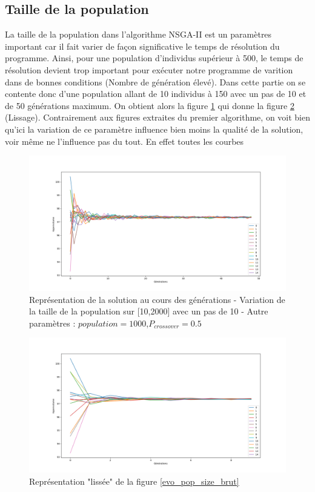 \documentclass[12pt]{report}
\begin{document}
      \subsection{Taille de la population}
      La taille de la population dans l'algorithme NSGA-II est un paramètres important car il fait varier de façon significative le temps de résolution du programme. Ainsi, pour une population d'individus supérieur à 500, le temps de résolution devient trop important pour exécuter notre programme de varition dans de bonnes conditions (Nombre de génération élevé). Dans cette partie on se contente donc d'une population allant de 10 individus à 150 avec un pas de 10 et de 50 générations maximum. On obtient alors la figure \ref{sch_pop_size_moy} qui donne la figure \ref{sch_pop_size_liss} (Lissage).
      Contrairement aux figures extraites du premier algorithme, on voit bien qu'ici la variation de ce paramètre influence bien moins la qualité de la solution, voir même ne l'influence pas du tout. En effet toutes les courbes



      \begin{figure}[h]
        \centering
        \includegraphics[width=15cm]{img/pop_size_sch_moy.png}
        \caption{Représentation de la solution au cours des générations - Variation de la taille de la population sur [10,2000] avec un pas de 10 - Autre paramètres : $population = 1000$,$P_{crossover} = 0.5$}
        \label{sch_pop_size_moy}
      \end{figure}

      \begin{figure}[!]
        \centering
        \includegraphics[width=15cm]{img/pop_size_sch_liss.png}
        \caption{Représentation "lissée" de la figure \ref{evo_pop_size_brut}}
        \label{sch_pop_size_liss}
      \end{figure}
\end{document}
